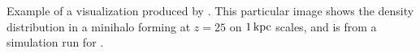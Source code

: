 \label{fig:vis}
Example of a visualization produced by .  This particular image shows the density distribution in a minihalo forming at $z=25$ on $1\,{\rm kpc}$ scales, and is from a simulation run for \citet{Hummeletal2015}.